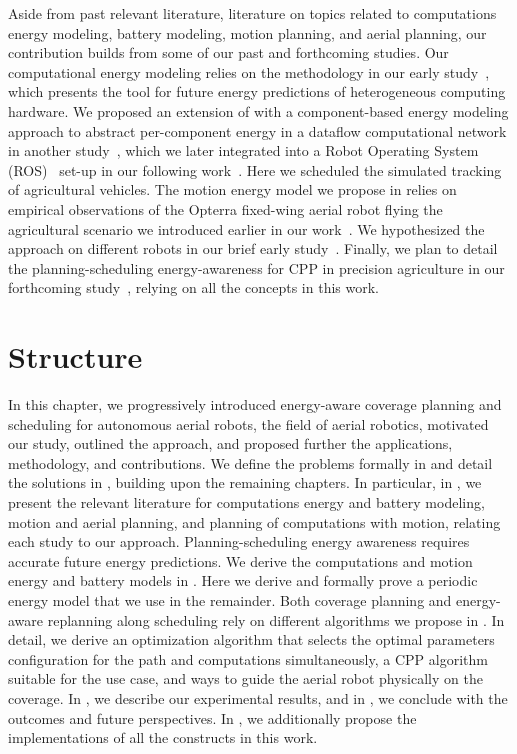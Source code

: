 Aside from past relevant literature, literature on topics related to computations energy modeling, battery modeling, motion planning, and aerial planning, our contribution builds from some of our past and forthcoming studies. Our computational energy modeling relies on the methodology in our early study~\citep{seewald2019coarse}, which presents the \powprof{} tool for future energy predictions of heterogeneous computing hardware. We proposed an extension of \powprof{} with a component-based energy modeling approach to abstract per-component energy in a dataflow computational network in another study~\citep{seewald2019component}, which we later integrated into a Robot Operating System (ROS)~\citep{quigley2009ros} set-up in our following work~\citep{zamanakos2020energy}. Here we scheduled the simulated tracking of agricultural vehicles. The motion energy model we propose in  relies on empirical observations of the Opterra fixed-wing aerial robot flying the agricultural scenario we introduced earlier in our work~\citep{seewald2020mechanical}. We hypothesized the approach on different robots in our brief early study~\citep{seewald2020beyond}. Finally, we plan to detail the planning-scheduling energy-awareness for CPP in precision agriculture in our forthcoming study~\citep{seewald202Xenergy}, relying on all the concepts in this work. 

\section{Structure}
\label{sec:structure}

In this chapter, we progressively introduced energy-aware coverage planning and scheduling for autonomous aerial robots, the field of aerial robotics, motivated our study, outlined the approach, and proposed further the applications, methodology, and contributions. We define the problems formally in  and detail the solutions in , building upon the remaining chapters. In particular, in , we present the relevant literature for computations energy and battery modeling, motion and aerial planning, and planning of computations with motion, relating each study to our approach. Planning-scheduling energy awareness requires accurate future energy predictions. We derive the computations and motion energy and battery models in . Here we derive and formally prove a periodic energy model that we use in the remainder. Both coverage planning and energy-aware replanning along scheduling rely on different algorithms we propose in . In detail, we derive an optimization algorithm that selects the optimal parameters configuration for the path and computations simultaneously, a CPP algorithm suitable for the use case, and ways to guide the aerial robot physically on the coverage. In , we describe our experimental results, and in , we conclude with the outcomes and future perspectives. In , we additionally propose the implementations of all the constructs in this work.


